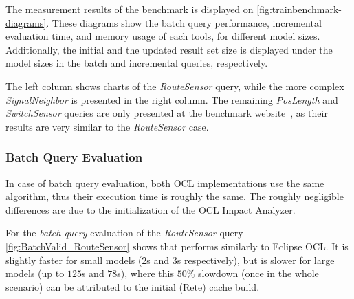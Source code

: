 The measurement results of the benchmark is displayed on
\autoref{fig:trainbenchmark-diagrams}. These diagrams show the batch query
performance, incremental evaluation time, and memory usage of each tools, for
different model sizes. Additionally, the initial and the updated result set size
is displayed under the model sizes in the batch and incremental queries,
respectively.

The left column shows charts of the \emph{RouteSensor} query,
while the more complex \emph{SignalNeighbor} is presented in the right column.
The remaining \emph{PosLength} and \emph{SwitchSensor} queries are only presented
at the benchmark website~\cite{TBwebsite}, as their results are very similar to the
\emph{RouteSensor} case.

\subsubsection{Batch Query Evaluation}
In case of batch query evaluation, both OCL implementations use the same
algorithm, thus their execution time is roughly the same. The roughly negligible
differences are due to the initialization of the OCL Impact Analyzer.

For the \emph{batch query} evaluation of the \emph{RouteSensor} query
\autoref{fig:BatchValid_RouteSensor} shows that \incquery{} performs similarly
to Eclipse OCL. It is slightly faster for small models ($2$s and $3$s
respectively), but is slower for large models (up to $125$s and $78$s), where
this $50\%$ slowdown (once in the whole scenario) can be attributed to the
initial (Rete) cache build.


